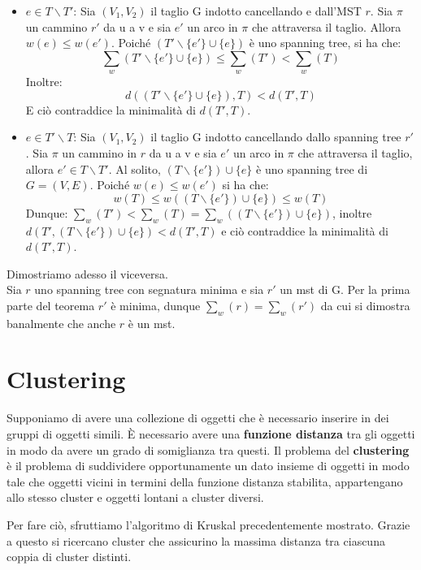 \begin{itemize}
    \item \textbf{$e \in T\backslash T'$}: Sia $(V_1, V_2)$ il taglio G indotto cancellando e dall'MST $r$. Sia $\pi$ un cammino $r'$ da u a v e sia $e'$ un arco in $\pi$ che attraversa il taglio. Allora $w(e) \leq w(e')$. Poiché $(T' \backslash \{e'\} \cup \{e\})$ è uno spanning tree, si ha che:
    \[\sum_w(T' \backslash \{e'\} \cup \{e\} ) \leq \sum_w(T') < \sum_w(T)\]
    Inoltre:
    \[d((T' \backslash \{e'\} \cup \{e\}),T) < d(T',T)\]
    E ciò contraddice la minimalità di $d(T',T)$.
    \item \textbf{$e \in T'\backslash T$}: Sia $(V_1, V_2)$ il taglio G indotto cancellando dallo spanning tree $r'$. Sia $\pi$ un cammino in $r$ da u a v e sia $e'$ un arco in $\pi$ che attraversa il taglio, allora $e' \in T \backslash T'$. Al solito, $(T \backslash \{e'\})\cup \{e\}$ è uno spanning tree di $G=(V, E)$. Poiché $w(e) \leq w(e')$ si ha che:
    \[w(T)\leq w((T \backslash \{e'\})\cup \{e\})\leq w(T)\]
    Dunque: $\sum_w(T') < \sum_w(T) = \sum_w((T \backslash \{e'\})\cup \{e\})$, inoltre $d(T', (T \backslash \{e'\})\cup \{e\}) < d(T',T)$ e ciò contraddice la minimalità di $d(T',T)$.
\end{itemize}
Dimostriamo adesso il viceversa.\\
Sia $r$ uno spanning tree con segnatura minima e sia $r'$ un mst di G. Per la prima parte del teorema $r'$ è minima, dunque $\sum_w (r) = \sum_w(r')$ da cui si dimostra banalmente che anche $r$ è un mst.

\section{Clustering}
Supponiamo di avere una collezione di oggetti che è necessario inserire in dei gruppi di oggetti simili. È necessario avere una \textbf{funzione distanza} tra gli oggetti in modo da avere un grado di somiglianza tra questi.
Il problema del \textbf{clustering} è il problema di suddividere opportunamente un dato insieme di oggetti in modo tale che oggetti vicini in termini della funzione distanza stabilita, appartengano allo stesso cluster e oggetti lontani a cluster diversi.

Per fare ciò, sfruttiamo l'algoritmo di Kruskal precedentemente mostrato. Grazie a questo si ricercano cluster che assicurino la massima distanza tra ciascuna coppia di cluster distinti.

